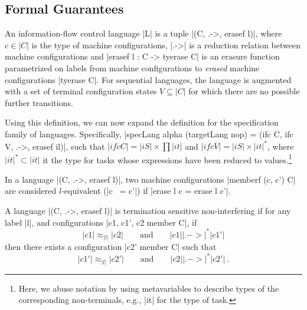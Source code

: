 \subsection{Formal Guarantees}

\begin{definition}
    An information-flow control language |L| is a tuple |(C, .->,
    erasef l)|, where $c \in |C|$ is the type of machine configurations, |.->| is a
    reduction relation between machine configurations and |erasef l : C -> tyerase C|
    is an erasure function parametrized on labels from machine configurations to \emph{erased} machine
    configurations |tyerase C|.  For sequential languages, the
    language is augmented with a set of terminal configuration states $V
    \subseteq |C|$ for which there are no possible further transitions.
\end{definition}

Using this definition, we can now expand the definition for the
specification family of languages.
%
Specifically, |specLang alpha (targetLang nop) = (ifc C, ifc V, .->,
erasef il)|, such that $|ifc C| = |iS| \times \prod |it|$ and $|ifc V|
= |iS| \times |it|^*$, where $|it|^* \subset |it|$ it the type for
tasks whose expressions have been reduced to values.\footnote{
Here, we abuse notation by using metavariables to describe types of
the corresponding non-terminals, e.g., |it| for the type of task.
}

\begin{definition}[$l$-equivalence]
    In a language |(C, .->, erasef l)|, two machine configurations
    |memberf (c, c') C| are considered $l$-equivalent (|c ~= c'|)
    if |erase l c = erase l c'|.
\end{definition}

\begin{definition}
  A language |(C, .->, erasef l)| is termination
  sensitive non-interfering if for any label |l|, and configurations
  |c1, c1', c2 member C|, if
  \begin{equation} \label{eq:tsni-lhs}
    |c1| \approx_{|l|} |c2|
    \qquad \text{and} \qquad
    |c1| |.->|^* |c1'|
  \end{equation}
  then there exists a configuration |c2' member C| such that
  \begin{equation} \label{eq:tsni-rhs}
    |c1'| \approx_{|l|} |c2'|
     \qquad \text{and} \qquad
    |c2| |.->|^* |c2'|
    \ \text{.}
  \end{equation}
\end{definition}

